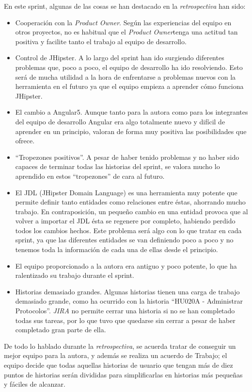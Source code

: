 En este sprint, algunas de las cosas se han destacado en la \emph{retrospectiva} han sido:
\begin{itemize}
	\item Cooperación con la \emph{Product Owner}. Según las experiencias del equipo en otros proyectos, no es habitual que el \emph{Product Owner}tenga una actitud tan positiva y facilite tanto el trabajo al equipo de desarrollo.
	\item Control de JHipster. A lo largo del sprint han ido surgiendo diferentes problemas que, poco a poco, el equipo de desarrollo ha ido resolviendo. Esto será de mucha utilidad a la hora de enfrentarse a problemas nuevos con la herramienta en el futuro ya que el equipo empieza a aprender cómo funciona JHipster.
	\item El cambio a Angular5. Aunque tanto para la autora como para los integrantes del equipo de desarrollo Angular era algo totalmente nuevo y difícil de aprender en un principio, valoran de forma muy positiva las posibilidades que ofrece.
	\item ``Tropezones positivos''. A pesar de haber tenido problemas y no haber sido capaces de terminar todas las historias del sprint, se valora mucho lo aprendido en estos ``tropezones'' de cara al futuro.
	\item El JDL (JHipster Domain Language) es una herramienta muy potente que permite definir tanto entidades como relaciones entre éstas, ahorrando mucho trabajo. En contraposición, un pequeño cambio en una entidad provoca que al volver a importar el JDL ésta se regenere por completo, habiendo perdido todos los cambios hechos. Este problema será algo con lo que tratar en cada sprint, ya que las diferentes entidades se van definiendo poco a poco y no tenemos toda la información de cada una de ellas desde el principio.
	\item El equipo proporcionado a la autora era antiguo y poco potente, lo que ha ralentizado su trabajo durante el sprint. 
	\item Historias demasiado grandes. Algunas historias tienen una carga de trabajo demasiado grande, como ha ocurrido con la historia ``HU020A - Administrar Protocolos''. \emph{JIRA} no permite cerrar una historia si no se han completado todas sus tareas, por lo que tuvo que quedarse sin cerrar a pesar de haber completado gran parte de ella.
\end{itemize}

De todo lo hablado durante la \emph{retrospectiva}, se acuerda tratar de conseguir un mejor equipo para la autora, y además se realiza un acuerdo de Trabajo; el equipo decide que todas aquellas historias de usuario que tengan más de diez puntos de historias serán divididas para simplificarlas en historias más pequeñas y fáciles de alcanzar.

